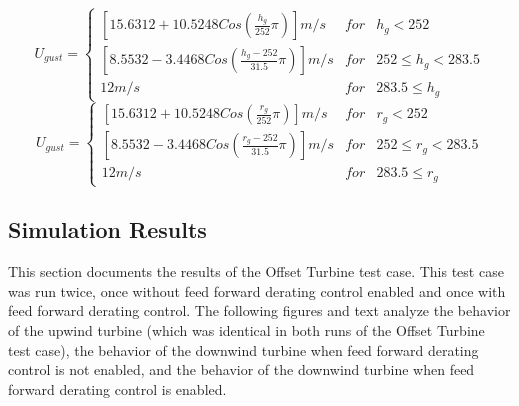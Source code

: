 \begin{equation} 
	U_{gust}=\left\{\begin{matrix}
\left [15.6312 +10.5248Cos\left ( \frac{h_g}{252 }\pi  \right )  \right ]m/s & for  & h_g<252\\ 
 \left [8.5532 -3.4468Cos\left ( \frac{h_g-252}{31.5}\pi  \right )  \right ]m/s & for  & 252 \leq h_g <283.5\\ 
 12 m/s &  for & 283.5 \leq h_g
\end{matrix}\right. 
\label{eq6-2}
\end{equation}
\begin{equation} 
	U_{gust}=\left\{\begin{matrix}
\left [15.6312 +10.5248Cos\left ( \frac{r_g}{252 }\pi  \right )  \right ]m/s & for  & r_g<252\\ 
 \left [8.5532 -3.4468Cos\left ( \frac{r_g-252}{31.5}\pi  \right )  \right ]m/s & for  & 252 \leq r_g <283.5\\ 
 12 m/s &  for & 283.5 \leq r_g
\end{matrix}\right. 
\label{eq6-3}
\end{equation}

\subsection{Simulation Results} \label{section6-6-2}
This section documents the results of the Offset Turbine test case. This test case was run twice, once without feed forward derating control enabled and once with feed forward derating control. The following figures and text analyze the behavior of the upwind turbine (which was identical in both runs of the Offset Turbine test case), the behavior of the downwind turbine when feed forward derating control is not enabled, and the behavior of the downwind turbine when feed forward derating control is enabled.

